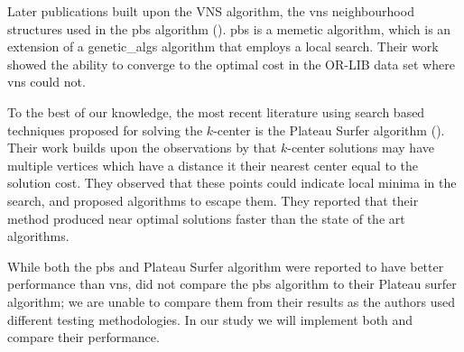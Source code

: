 Later publications built upon the VNS algorithm, the \acrshort{vns} neighbourhood structures used in the \acrshort{pbs} algorithm (\cite{pullan_memetic_2008}). \acrshort{pbs} is a memetic algorithm, which is an extension of a \gls{genetic_algs} algorithm that employs a local search. Their work showed the ability to converge to the optimal cost in the OR-LIB data set where \acrshort{vns} could not.

To the best of our knowledge, the most recent literature using search based techniques proposed for solving the $k$-center is the Plateau Surfer algorithm (\cite{battiti_new_2017}). Their work builds upon the observations by \citeauthor{mladenovic_solving_2003} that $k$-center solutions may have multiple vertices which have a distance it their nearest center equal to the solution cost. They observed that these points could indicate local minima in the search, and proposed algorithms to escape them. They reported that their method produced near optimal solutions faster than the state of the art algorithms.

While both the \acrshort{pbs} and Plateau Surfer algorithm were reported to have better performance than \acrshort{vns}, \citeauthor{battiti_new_2017} did not compare the \acrshort{pbs} algorithm to their Plateau surfer algorithm; we are unable to compare them from their results as the authors used different testing methodologies. In our study we will implement both and compare their performance.